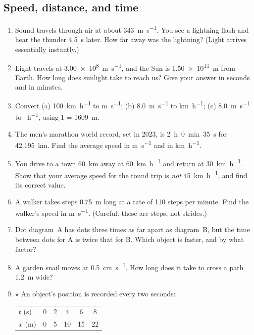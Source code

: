 \documentclass[11pt,twoside,openany]{book}
\begin{document}
\subsection*{Speed, distance, and time}
\begin{enumerate}[label=\textbf{\thechapter.\arabic*},resume=exercises,leftmargin=*]
  \item Sound travels through air at about \SI{343}{\metre\per\second}. You see a lightning flash and hear the thunder \SI{4.5}{\second} later. How far away was the lightning? (Light arrives essentially instantly.)
  \item Light travels at \SI{3.00e8}{\metre\per\second}, and the Sun is \SI{1.50e11}{\metre} from Earth. How long does sunlight take to reach us? Give your answer in seconds and in minutes.
  \item Convert (a) \SI{100}{\kilo\metre\per\hour} to \si{\metre\per\second}; (b) \SI{8.0}{\metre\per\second} to \si{\kilo\metre\per\hour}; (c) \SI{8.0}{\metre\per\second} to \si{\mile\per\hour}, using \SI{1}{\mile} = \SI{1609}{\metre}.
  \item The men's marathon world record, set in 2023, is \SI{2}{\hour}~\SI{0}{\minute}~\SI{35}{\second} for \SI{42.195}{\kilo\metre}. Find the average speed in \si{\metre\per\second} and in \si{\kilo\metre\per\hour}.
  \item You drive to a town \SI{60}{\kilo\metre} away at \SI{60}{\kilo\metre\per\hour} and return at \SI{30}{\kilo\metre\per\hour}. Show that your average speed for the round trip is \emph{not} \SI{45}{\kilo\metre\per\hour}, and find its correct value.
  \item A walker takes steps \SI{0.75}{\metre} long at a rate of \num{110} steps per minute. Find the walker's speed in \si{\metre\per\second}. (Careful: these are steps, not strides.)
  \item Dot diagram~A has dots three times as far apart as diagram~B, but the time between dots for A is twice that for B. Which object is faster, and by what factor?
  \item A garden snail moves at \SI{0.5}{\centi\metre\per\second}. How long does it take to cross a path \SI{1.2}{\metre} wide?
  \item $\star$ An object's position is recorded every two seconds:
  \begin{center}
  \begin{tabular}{lccccc}
  \toprule
  $t$ (s) & 0 & 2 & 4 & 6 & 8 \\
  $x$ (m) & 0 & 5 & 10 & 15 & 22 \\

\end{tabular}
\end{center}
\end{enumerate}
\end{document}
